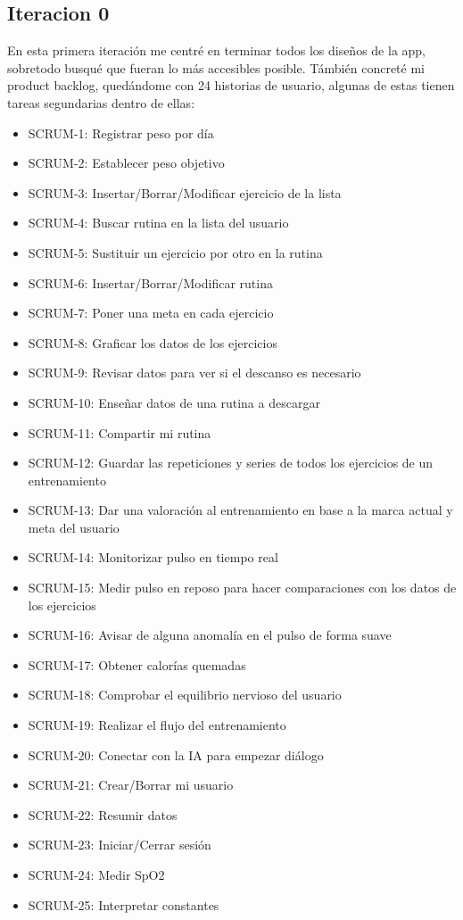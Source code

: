 \subsection{Iteracion 0}
En esta primera iteración me centré en terminar todos los diseños de la app, sobretodo busqué que fueran lo más accesibles posible. Támbién concreté mi product backlog, quedándome con 24 historias de usuario, algunas de estas tienen tareas segundarias dentro de ellas:
\begin{itemize}
    \item SCRUM-1: Registrar peso por día
    \item SCRUM-2: Establecer peso objetivo
    \item SCRUM-3: Insertar/Borrar/Modificar ejercicio de la lista
    \item SCRUM-4: Buscar rutina en la lista del usuario
    \item SCRUM-5: Sustituir un ejercicio por otro en la rutina
    \item SCRUM-6: Insertar/Borrar/Modificar rutina
    \item SCRUM-7: Poner una meta en cada ejercicio
    \item SCRUM-8: Graficar los datos de los ejercicios
    \item SCRUM-9: Revisar datos para ver si el descanso es necesario
    \item SCRUM-10: Enseñar datos de una rutina a descargar
    \item SCRUM-11: Compartir mi rutina
    \item SCRUM-12: Guardar las repeticiones y series de todos los ejercicios de un entrenamiento
    \item SCRUM-13: Dar una valoración al entrenamiento en base a la marca actual y meta del usuario
    \item SCRUM-14: Monitorizar pulso en tiempo real
    \item SCRUM-15: Medir pulso en reposo para hacer comparaciones con los datos de los ejercicios
    \item SCRUM-16: Avisar de alguna anomalía en el pulso de forma suave
    \item SCRUM-17: Obtener calorías quemadas
    \item SCRUM-18: Comprobar el equilibrio nervioso del usuario
    \item SCRUM-19: Realizar el flujo del entrenamiento
    \item SCRUM-20: Conectar con la IA para empezar diálogo
    \item SCRUM-21: Crear/Borrar mi usuario
    \item SCRUM-22: Resumir datos
    \item SCRUM-23: Iniciar/Cerrar sesión
    \item SCRUM-24: Medir SpO2
    \item SCRUM-25: Interpretar constantes
\end{itemize}

